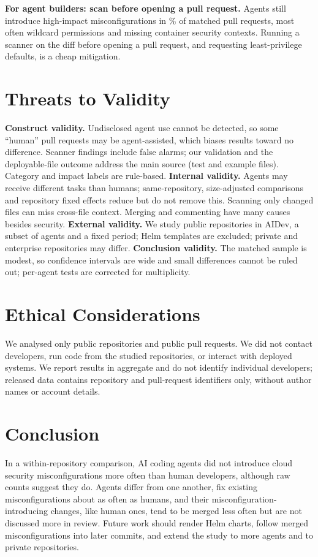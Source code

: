 \documentclass[10pt,conference]{IEEEtran}
\begin{document}
\textbf{For agent builders: scan before opening a pull request.} Agents still introduce high-impact misconfigurations in \AgentHighPct\% of matched pull requests, most often wildcard permissions and missing container security contexts. Running a scanner on the diff before opening a pull request, and requesting least-privilege defaults, is a cheap mitigation.

\section{Threats to Validity}
\textbf{Construct validity.} Undisclosed agent use cannot be detected, so some ``human'' pull requests may be agent-assisted, which biases results toward no difference. Scanner findings include false alarms; our validation and the deployable-file outcome address the main source (test and example files). Category and impact labels are rule-based.
\textbf{Internal validity.} Agents may receive different tasks than humans; same-repository, size-adjusted comparisons and repository fixed effects reduce but do not remove this. Scanning only changed files can miss cross-file context. Merging and commenting have many causes besides security.
\textbf{External validity.} We study public repositories in AIDev, a subset of agents and a fixed period; Helm templates are excluded; private and enterprise repositories may differ.
\textbf{Conclusion validity.} The matched sample is modest, so confidence intervals are wide and small differences cannot be ruled out; per-agent tests are corrected for multiplicity.

\section{Ethical Considerations}
We analysed only public repositories and public pull requests. We did not contact developers, run code from the studied repositories, or interact with deployed systems. We report results in aggregate and do not identify individual developers; released data contains repository and pull-request identifiers only, without author names or account details.

\section{Conclusion}
In a within-repository comparison, AI coding agents did not introduce cloud security misconfigurations more often than human developers, although raw counts suggest they do. Agents differ from one another, fix existing misconfigurations about as often as humans, and their misconfiguration-introducing changes, like human ones, tend to be merged less often but are not discussed more in review. Future work should render Helm charts, follow merged misconfigurations into later commits, and extend the study to more agents and to private repositories.
\end{document}

